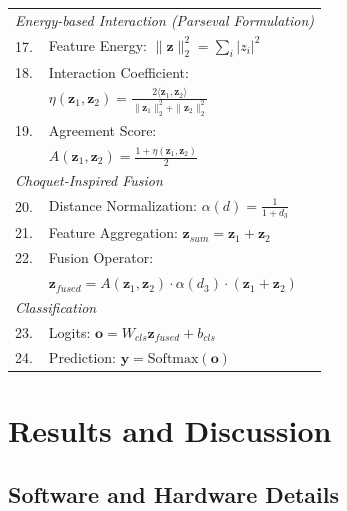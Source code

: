 \documentclass[preprint,12pt]{elsarticle}
\begin{document}
\begin{table}[h]
\begin{tabular}{@{}ll@{}}
\midrule
\multicolumn{2}{l}{\textit{Energy-based Interaction (Parseval Formulation)}} \\

17. & Feature Energy: $\|\mathbf{z}\|_2^2 = \sum_i |z_i|^2$ \\

18. & Interaction Coefficient: \\

 & \quad $\eta(\mathbf{z}_1,\mathbf{z}_2) =
 \frac{2\langle \mathbf{z}_1,\mathbf{z}_2 \rangle}
 {\|\mathbf{z}_1\|_2^2 + \|\mathbf{z}_2\|_2^2}$ \\

19. & Agreement Score: \\

 & \quad $A(\mathbf{z}_1,\mathbf{z}_2) =
 \frac{1+\eta(\mathbf{z}_1,\mathbf{z}_2)}{2}$ \\

\midrule
\multicolumn{2}{l}{\textit{Choquet-Inspired Fusion}} \\

20. & Distance Normalization: $\alpha(d)=\frac{1}{1+d_3}$ \\

21. & Feature Aggregation: $\mathbf{z}_{sum}=\mathbf{z}_1+\mathbf{z}_2$ \\

22. & Fusion Operator: \\

 & \quad $\mathbf{z}_{fused}=A(\mathbf{z}_1,\mathbf{z}_2)\cdot
 \alpha(d_3)\cdot (\mathbf{z}_1+\mathbf{z}_2)$ \\

\midrule
\multicolumn{2}{l}{\textit{Classification}} \\

23. & Logits: $\mathbf{o} = W_{cls}\mathbf{z}_{fused} + b_{cls}$ \\

24. & Prediction: $\mathbf{y} = \text{Softmax}(\mathbf{o})$ \\

\bottomrule
\end{tabular}
\end{table}


\FloatBarrier
\section{Results and Discussion}

\FloatBarrier
\subsection{Software and Hardware Details}
\end{document}
